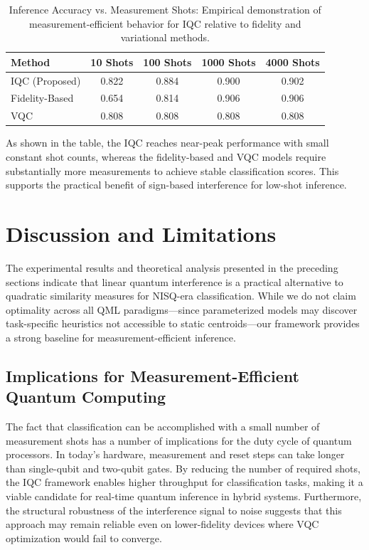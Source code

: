 \documentclass[conference]{IEEEtran}
\begin{document}
\begin{table}[ht]
\centering
\caption{Inference Accuracy vs. Measurement Shots: Empirical demonstration of measurement-efficient behavior for IQC relative to fidelity and variational methods.}
\begin{tabular}{l c c c c}
\toprule
Method & 10 Shots & 100 Shots & 1000 Shots & 4000 Shots \\
\midrule
IQC (Proposed) & 0.822 & 0.884 & 0.900 & 0.902 \\
Fidelity-Based & 0.654 & 0.814 & 0.906 & 0.906 \\
VQC & 0.808 & 0.808 & 0.808 & 0.808 \\
\bottomrule
\end{tabular}
\end{table}

As shown in the table, the IQC reaches near-peak performance with small constant shot counts, whereas the fidelity-based and VQC models require substantially more measurements to achieve stable classification scores. This supports the practical benefit of sign-based interference for low-shot inference.

\section{Discussion and Limitations}

The experimental results and theoretical analysis presented in the preceding sections indicate that linear quantum interference is a practical alternative to quadratic similarity measures for NISQ-era classification. While we do not claim optimality across all QML paradigms—since parameterized models may discover task-specific heuristics not accessible to static centroids—our framework provides a strong baseline for measurement-efficient inference.

\subsection{Implications for Measurement-Efficient Quantum Computing}

The fact that classification can be accomplished with a small number of measurement shots has a number of implications for the duty cycle of quantum processors. In today’s hardware, measurement and reset steps can take longer than single-qubit and two-qubit gates. By reducing the number of required shots, the IQC framework enables higher throughput for classification tasks, making it a viable candidate for real-time quantum inference in hybrid systems. Furthermore, the structural robustness of the interference signal to noise suggests that this approach may remain reliable even on lower-fidelity devices where VQC optimization would fail to converge.
\end{document}
